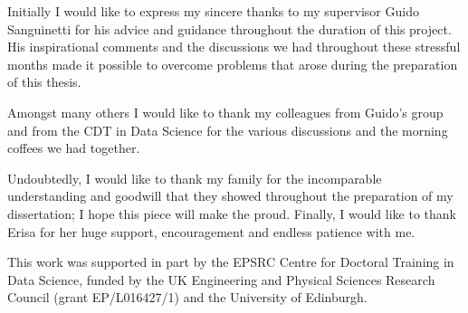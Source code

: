 \begin{acknowledgements}
Initially I would like to express my sincere thanks to my supervisor Guido Sanguinetti for his advice and guidance throughout the duration of this project. His inspirational comments and the discussions we had throughout these stressful months made it possible to overcome problems that arose during the preparation of this thesis.

Amongst many others I would like to thank my colleagues from Guido's group and from the CDT in Data Science for the various discussions and the morning coffees we had together.

Undoubtedly, I would like to thank my family for the incomparable understanding and goodwill that they showed throughout the preparation of my dissertation; I hope this piece will make the proud. Finally, I would like to thank Erisa for her huge support, encouragement and endless patience with me.

This work was supported in part by the EPSRC Centre for Doctoral Training in Data Science, funded by the UK Engineering and Physical Sciences Research Council (grant EP/L016427/1) and the University of Edinburgh.

\end{acknowledgements}
